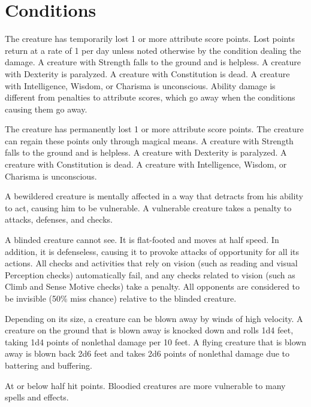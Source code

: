 \appendix
\chapter{Conditions}

 The creature has temporarily lost 1 or more attribute score points. Lost points return at a rate of 1 per day unless noted otherwise by the condition dealing the damage. A creature with Strength  falls to the ground and is helpless. A creature with Dexterity  is paralyzed. A creature with Constitution  is dead. A creature with Intelligence, Wisdom, or Charisma  is unconscious. Ability damage is different from penalties to attribute scores, which go away when the conditions causing them go away.

 The creature has permanently lost 1 or more attribute score points. The creature can regain these points only through magical means. A creature with Strength  falls to the ground and is helpless. A creature with Dexterity  is paralyzed. A creature with Constitution  is dead. A creature with Intelligence, Wisdom, or Charisma  is unconscious.

 A bewildered creature is mentally affected in a way that detracts from his ability to act, causing him to be vulnerable. A vulnerable creature takes a  penalty to attacks, defenses, and checks.

 A blinded creature cannot see. It is flat-footed and moves at half speed. In addition, it is defenseless, causing it to provoke attacks of opportunity for all its actions. All checks and activities that rely on vision (such as reading and visual Perception checks) automatically fail, and any checks related to vision (such as Climb and Sense Motive checks) take a  penalty. All opponents are considered to be invisible (50\% miss chance) relative to the blinded creature.

 Depending on its size, a creature can be blown away by winds of high velocity. A creature on the ground that is blown away is knocked down and rolls 1d4  feet, taking 1d4 points of nonlethal damage per 10 feet. A flying creature that is blown away is blown back 2d6  feet and takes 2d6 points of nonlethal damage due to battering and buffering.

 At or below half hit points. Bloodied creatures are more vulnerable to many spells and effects.

